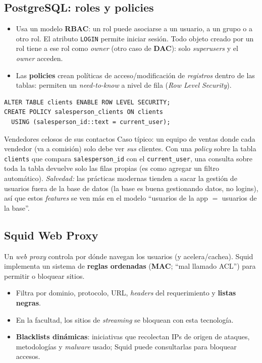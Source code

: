 \documentclass[11pt,a4paper]{article}
\begin{document}
\subsection{PostgreSQL: roles y policies}
\begin{itemize}[leftmargin=1.4em,itemsep=1pt]
  \item Usa un modelo \textbf{RBAC}: un rol puede asociarse a un usuario, a un grupo o a otro
        rol. El atributo \texttt{LOGIN} permite iniciar sesión. Todo objeto creado por un rol
        tiene a ese rol como \emph{owner} (otro caso de \textbf{DAC}): solo \emph{superusers} y
        el \emph{owner} acceden.
  \item Las \textbf{policies} crean políticas de acceso/modificación de \emph{registros} dentro
        de las tablas: permiten un \emph{need-to-know} a nivel de fila (\emph{Row Level
        Security}).
\end{itemize}
\begin{slidebox}
\begin{lstlisting}[style=code]
ALTER TABLE clients ENABLE ROW LEVEL SECURITY;
CREATE POLICY salesperson_clients ON clients
  USING (salesperson_id::text = current_user);
\end{lstlisting}
\end{slidebox}
\begin{anecbox}{Vendedores celosos de sus contactos}
Caso típico: un equipo de ventas donde cada vendedor (va a comisión) solo debe ver
\emph{sus} clientes. Con una \emph{policy} sobre la tabla \texttt{clients} que compara
\texttt{salesperson\_id} con el \texttt{current\_user}, una consulta sobre toda la tabla
devuelve solo las filas propias (es como agregar un filtro automático). \emph{Salvedad:} las
prácticas modernas tienden a sacar la gestión de usuarios fuera de la base de datos (la base
es buena gestionando datos, no logins), así que estos \emph{features} se ven más en el modelo
``usuarios de la app $=$ usuarios de la base''.
\end{anecbox}

\subsection{Squid Web Proxy}
Un \emph{web proxy} controla por dónde navegan los usuarios (y acelera/cachea). Squid
implementa un sistema de \textbf{reglas ordenadas} (\textbf{MAC}; ``mal llamado ACL'') para
permitir o bloquear sitios.
\begin{itemize}[leftmargin=1.4em,itemsep=1pt]
  \item Filtra por dominio, protocolo, URL, \emph{headers} del requerimiento y
        \textbf{listas negras}.
  \item En la facultad, los sitios de \emph{streaming} se bloquean con esta tecnología.
  \item \textbf{Blacklists dinámicas}: iniciativas que recolectan IPs de origen de ataques,
        metodologías y \emph{malware} usado; Squid puede consultarlas para bloquear accesos.
\end{itemize}
\end{document}
